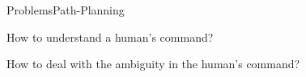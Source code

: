 \begin{frame}{Problems}{Path-Planning}

\begin{block}{}
How to understand a human's command?
\end{block}

\begin{block}{}
How to deal with the ambiguity in the human's command?
\end{block}

\end{frame}


